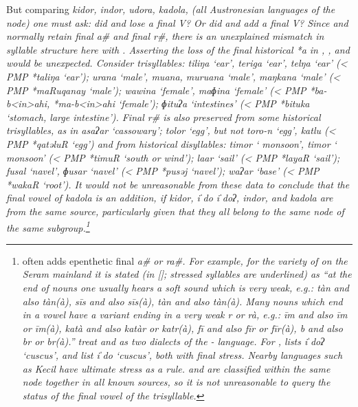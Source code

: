 But comparing  \it{kidor},
 \it{indor},  \it{udora},
 \it{kadola}, (all Austronesian 
languages of the  node) one must ask: did
 and  lose a final V? Or did 
and  add a final V? Since 
and  normally retain final a{\#}
and final r{\#}, there is an unexplained mismatch in syllable
structure here with .
Asserting the loss of the final historical *a in ,
, and  would be unexpected.
Consider trisyllables:  \it{tiliŋa} ‘ear’,
 \it{teriga} ‘ear’,  \it{telŋa} ‘ear’ (< PMP *taliŋa
‘ear’);  \it{urana} ‘male’,
 \it{muana, muruana} ‘male’,
 \it{maŋkana} ‘male’ (< PMP *maRuqanay ‘male’); 
\it{wawina} ‘female’,  \it{maɸina} ‘female’ (< PMP *ba-b<in>ahi,
*ma-b<in>ahi ‘female’);  \it{ɸituʔa} ‘intestines’ (< PMP
*bituka ‘stomach, large intestine’).
Final r{\#} is also preserved from some historical trisyllables,
as in  \it{asaʔar} ‘cassowary’;  \it{tolor} ‘egg’,
but not  \it{toro-n} ‘egg’,
 \it{katlu} (< PMP *qatəluR ‘egg’)
and from historical disyllables:  \it{timor} ‘ monsoon’,
 \it{timor} ‘ monsoon’ (< PMP *timuR ‘south or 
wind’);  \it{laar} ‘sail’ (< PMP *layaR ‘sail’);  \it{fusal}
‘navel’,  \it{ɸusar} ‘navel’ (< PMP *pusəj ‘navel’);  \it{waʔar}
‘base’ (< PMP *wakaR ‘root’).
It would not be unreasonable from these data to conclude that
the final vowel of  \it{kadola} is an addition,
if  \it{kidor},  \it{iˈdo {\tl} iˈdoʔ},
 \it{indor}, and  \it{kadola} are from the same
source, particularly given that they all belong to the same node of the
same subgroup.\footnote{
		 often adds epenthetic final \it{a{\#}} or \it{ra{\#}}.
		For example, for the  variety of  on the Seram mainland
		it is stated (in \citeauthor{Stokhof1982a} [\citeyear[55]{Stokhof1982a}];
		stressed syllables are underlined)
		as “at the end of nouns one usually hears a soft  sound which
		is very weak, e.g.: tàn and also tàn(à), sīs
		and also sīs(à), tàn and also tàn(à).
		Many nouns which end in a vowel have a variant ending in a very
		weak r or rà,
		e.g.: īm and also īm or īm(à),
		katà and also katàr or katr(à),
		fī and also fīr or fīr(à),
		b and also br or br(à).” \citet{LoskiLoski1989} treat 
		and  as two dialects of the - language.
		For , \citet{Visser2019a} lists \it{iˈdoʔ} ‘cuscus’,
		and \citet[51]{Kakerissa1986} list \it{iˈdo} ‘cuscus’,
		both with final stress.
		Nearby languages such as  Kecil have ultimate stress as a rule.
		 and  are classified within the same node together
		in all known sources,
		so it is not unreasonable to query the status of the final vowel
		of the  trisyllable.}

